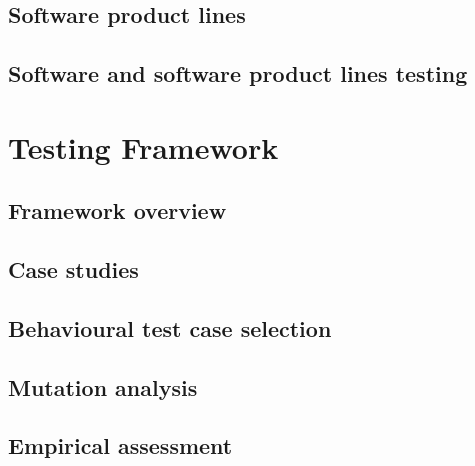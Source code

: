 \documentclass[openright,twoside]{memoir}
\begin{document}
\chapter{Software product lines}
\label{chap:vis}


%

\chapter{Software and software product lines testing}
\label{chap:vis-testing}



\part{Testing Framework}
\label{part:framework}

\chapter{Framework overview}
\label{chap:frameworkdescription}


\chapter{Case studies}
\label{chap:casestudies}


\chapter{Behavioural test case selection}
\label{chap:coverage}


\chapter{Mutation analysis}
\label{chap:mutation}


\chapter{Empirical assessment}
\label{chap:assessment}

\end{document}
